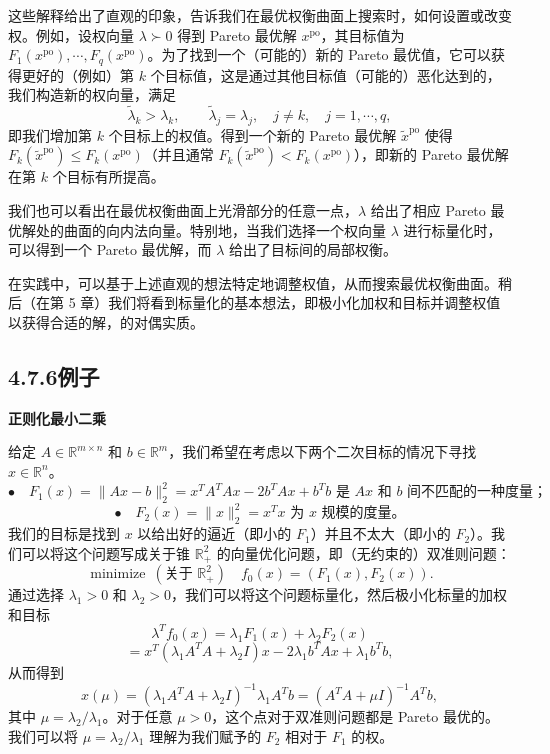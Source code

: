 \documentclass[UTF8, 12pt, fontset=fandol, oneside]{ctexart}
\begin{document}
这些解释给出了直观的印象，告诉我们在最优权衡曲面上搜索时，如何设置或改变权。例如，设权向量 $\lambda\succ 0$ 得到 Pareto 最优解 $x^{\mathrm{po}}$，其目标值为 $F_1(x^{\mathrm{po}}),\cdots,F_q(x^{\mathrm{po}})$。为了找到一个（可能的）新的 Pareto 最优值，它可以获得更好的（例如）第 $k$ 个目标值，这是通过其他目标值（可能的）恶化达到的，我们构造新的权向量，满足
\[
\tilde{\lambda}_k>\lambda_k,\qquad \tilde{\lambda}_j=\lambda_j,\quad j\neq k,\quad j=1,\cdots,q,
\]
即我们增加第 $k$ 个目标上的权值。得到一个新的 Pareto 最优解 $\tilde{x}^{\mathrm{po}}$ 使得 $F_k(\tilde{x}^{\mathrm{po}})\leq F_k(x^{\mathrm{po}})$（并且通常 $F_k(\tilde{x}^{\mathrm{po}})<F_k(x^{\mathrm{po}})$），即新的 Pareto 最优解在第 $k$ 个目标有所提高。

我们也可以看出在最优权衡曲面上光滑部分的任意一点，$\lambda$ 给出了相应 Pareto 最优解处的曲面的向内法向量。特别地，当我们选择一个权向量 $\lambda$ 进行标量化时，可以得到一个 Pareto 最优解，而 $\lambda$ 给出了目标间的局部权衡。

在实践中，可以基于上述直观的想法特定地调整权值，从而搜索最优权衡曲面。稍后（在第 5 章）我们将看到标量化的基本想法，即极小化加权和目标并调整权值以获得合适的解，的对偶实质。

\subsection*{4.7.6\quad 例子}

\noindent\textbf{正则化最小二乘}

给定 $A\in\mathbb{R}^{m\times n}$ 和 $b\in\mathbb{R}^m$，我们希望在考虑以下两个二次目标的情况下寻找 $x\in\mathbb{R}^n$。
\[
\bullet\quad F_1(x)=\|Ax-b\|_2^2=x^TA^TAx-2b^TAx+b^Tb\text{ 是 }Ax\text{ 和 }b\text{ 间不匹配的一种度量；}
\]
\[
\bullet\quad F_2(x)=\|x\|_2^2=x^Tx\text{ 为 }x\text{ 规模的度量。}
\]
我们的目标是找到 $x$ 以给出好的逼近（即小的 $F_1$）并且不太大（即小的 $F_2$）。我们可以将这个问题写成关于锥 $\mathbb{R}_+^2$ 的向量优化问题，即（无约束的）双准则问题：
\[
\mathop{\mathrm{minimize}}\ (\text{关于 }\mathbb{R}_+^2)\quad f_0(x)=(F_1(x),F_2(x)).
\]
通过选择 $\lambda_1>0$ 和 $\lambda_2>0$，我们可以将这个问题标量化，然后极小化标量的加权和目标
\[
\lambda^Tf_0(x)=\lambda_1F_1(x)+\lambda_2F_2(x)
\]
\[
=x^T(\lambda_1A^TA+\lambda_2I)x-2\lambda_1b^TAx+\lambda_1b^Tb,
\]
从而得到
\[
x(\mu)=(\lambda_1A^TA+\lambda_2I)^{-1}\lambda_1A^Tb=(A^TA+\mu I)^{-1}A^Tb,
\]
其中 $\mu=\lambda_2/\lambda_1$。对于任意 $\mu>0$，这个点对于双准则问题都是 Pareto 最优的。我们可以将 $\mu=\lambda_2/\lambda_1$ 理解为我们赋予的 $F_2$ 相对于 $F_1$ 的权。
\end{document}
